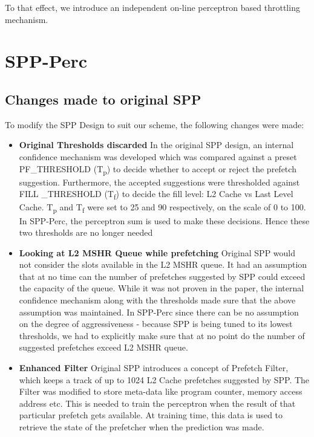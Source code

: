 \documentclass{sig-alternate}
\begin{document}
To that effect, we introduce an independent on-line perceptron based throttling mechanism.

\section{SPP-Perc}

\subsection{Changes made to original SPP}
To modify the SPP Design to suit our scheme, the following changes were made:

\begin{itemize}
\item \textbf{Original Thresholds discarded}\newline
In the original SPP design, an internal confidence mechanism was developed which was compared against a preset PF\_THRESHOLD (T\textsubscript{p}) to decide whether to accept or reject the prefetch suggestion.
Furthermore, the accepted suggestions were thresholded against FILL \_THRESHOLD (T\textsubscript{f}) to decide the fill level: L2 Cache vs Last Level Cache.
T\textsubscript{p} and T\textsubscript{f} were set to 25 and 90 respectively, on the scale of 0 to 100.
In SPP-Perc, the perceptron sum is used to make these decisions. 
Hence these two thresholds are no longer needed

\item \textbf{Looking at L2 MSHR Queue while prefetching}\newline
Original SPP would not consider the slots available in the L2 MSHR queue. 
It had an assumption that at no time can the number of prefetches suggested by SPP could exceed the capacity of the queue. 
While it was not proven in the paper, the internal confidence mechanism along with the thresholds made sure that the above assumption was maintained. 
In SPP-Perc since there can be no assumption on the degree of aggressiveness - because SPP is being tuned to its lowest thresholds, we had to explicitly make sure that at no point do the number of suggested prefetches exceed L2 MSHR queue.

\item \textbf{Enhanced Filter}\newline
Original SPP introduces a concept of Prefetch Filter, which keeps a track of up to 1024 L2 Cache prefetches suggested by SPP. 
The Filter was modified to store meta-data like program counter, memory access address etc. 
This is needed to train the perceptron when the result of that particular prefetch gets available. 
At training time, this data is used to retrieve the state of the prefetcher when the prediction was made.


\end{itemize}
\end{document}
